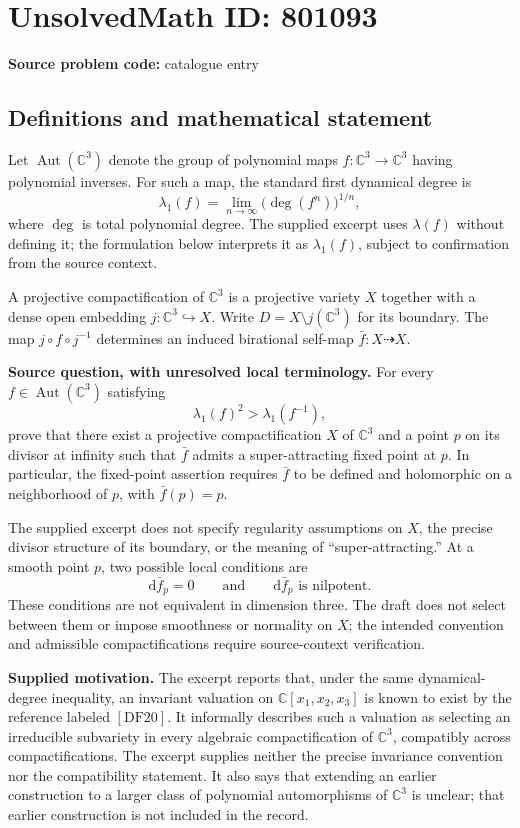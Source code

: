 \documentclass[11pt]{article}
\newcommand{\C}{\mathbb{C}}
\begin{document}
\section*{UnsolvedMath ID: 801093}
\textbf{Source problem code:} catalogue entry
\subsection{Definitions and mathematical statement}
Let \(\operatorname{Aut}(\C^3)\) denote the group of polynomial maps \(f\colon\C^3\to\C^3\) having polynomial inverses. For such a map, the standard first dynamical degree is
\[
\lambda_1(f)=\lim_{n\to\infty}\bigl(\deg(f^n)\bigr)^{1/n},
\]
where \(\deg\) is total polynomial degree. The supplied excerpt uses \(\lambda(f)\) without defining it; the formulation below interprets it as \(\lambda_1(f)\), subject to confirmation from the source context.

A projective compactification of \(\C^3\) is a projective variety \(X\) together with a dense open embedding \(j\colon\C^3\hookrightarrow X\). Write \(D=X\setminus j(\C^3)\) for its boundary. The map \(j\circ f\circ j^{-1}\) determines an induced birational self-map \(\bar f\colon X\dashrightarrow X\).

\textbf{Source question, with unresolved local terminology.} For every \(f\in\operatorname{Aut}(\C^3)\) satisfying
\[
\lambda_1(f)^2>\lambda_1(f^{-1}),
\]
prove that there exist a projective compactification \(X\) of \(\C^3\) and a point \(p\) on its divisor at infinity such that \(\bar f\) admits a super-attracting fixed point at \(p\). In particular, the fixed-point assertion requires \(\bar f\) to be defined and holomorphic on a neighborhood of \(p\), with \(\bar f(p)=p\).

The supplied excerpt does not specify regularity assumptions on \(X\), the precise divisor structure of its boundary, or the meaning of ``super-attracting.'' At a smooth point \(p\), two possible local conditions are
\[
\mathrm d\bar f_p=0
\qquad\text{and}\qquad
\mathrm d\bar f_p\text{ is nilpotent}.
\]
These conditions are not equivalent in dimension three. The draft does not select between them or impose smoothness or normality on \(X\); the intended convention and admissible compactifications require source-context verification.

\textbf{Supplied motivation.} The excerpt reports that, under the same dynamical-degree inequality, an invariant valuation on \(\C[x_1,x_2,x_3]\) is known to exist by the reference labeled \([\mathrm{DF20}]\). It informally describes such a valuation as selecting an irreducible subvariety in every algebraic compactification of \(\C^3\), compatibly across compactifications. The excerpt supplies neither the precise invariance convention nor the compatibility statement. It also says that extending an earlier construction to a larger class of polynomial automorphisms of \(\C^3\) is unclear; that earlier construction is not included in the record.
\end{document}

